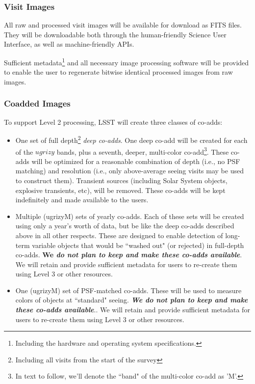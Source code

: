 \documentclass[12pt]{article}
\begin{document}
\subsubsection{Visit Images}

All raw and processed visit images will be available for download as FITS files. They will be downloadable both through the human-friendly Science User Interface, as well as machine-friendly APIs.

Sufficient metadata\footnote{Including the hardware and operating system specifications.} and all necessary image processing software will be provided to enable the user to regenerate bitwise identical processed images from raw images.

\subsubsection{Coadded Images}
\label{sec:coadds}

To support Level 2 processing, LSST will create three classes of co-adds:
    \begin{itemize}
        \item One set of full depth\footnote{Including all visits from the start of the survey} {\em deep co-adds}. One deep co-add will be created for each of the $ugrizy$ bands, plus a seventh, deeper, multi-color co-add\footnote{In text to follow, we'll denote the ``band" of the multi-color co-add as 'M'.}. These co-adds will be optimized for a reasonable combination of depth (i.e., no PSF matching) and resolution (i.e., only above-average seeing visits may be used to construct them). Transient sources (including Solar System objects, explosive transients, etc), will be removed. These co-adds will be kept indefinitely and made available to the users.
        \item Multiple (ugrizyM) sets of yearly co-adds. Each of these sets will be created using only a year's worth of data, but be like the deep co-adds described above in all other respects. These are designed to enable detection of long-term variable objects that would be ``washed out" (or rejected) in full-depth co-adds. {\bf We \em do not plan to keep and make these co-adds available}. We will retain and provide sufficient metadata for users to re-create them using Level 3 or other resources.
        \item One (ugrizyM) set of PSF-matched co-adds. These will be used to measure colors of objects at ``standard" seeing. {\bf \em We do not plan to keep and make these co-adds available}.. We will retain and provide sufficient metadata for users to re-create them using Level 3 or other resources.
    \end{itemize}
\end{document}
